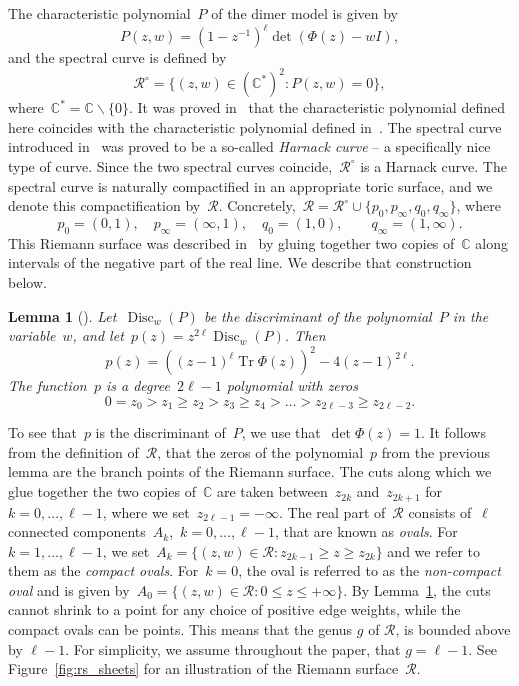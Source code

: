 \documentclass[11pt]{article}
\theoremstyle{plain}
\newtheorem{lemma}[theorem]{Lemma}
\theoremstyle{definition}
\numberwithin{equation}{section}
\newcommand{\CC}{\mathbb{C}}
\DeclareMathOperator{\Tr}{Tr}
\begin{document}
The characteristic polynomial~$P$ of the dimer model is given by
\begin{equation}
P(z,w)=(1-z^{-1})^\ell \det(\Phi(z)-wI),
\end{equation}
and the spectral curve is defined by
\begin{equation}
\mathcal R^\circ=\{(z,w)\in (\CC^*)^2: P(z,w)=0\},
\end{equation}
where~$\CC^*=\CC\backslash\{0\}$. It was proved in~\cite{Ber21} that the characteristic polynomial defined here coincides with the characteristic polynomial defined in~\cite{KOS06}. The spectral curve introduced in~\cite{KOS06} was proved to be a so-called \emph{Harnack curve} -- a specifically nice type of curve. Since the two spectral curves coincide,~$\mathcal R^\circ$ is a Harnack curve. The spectral curve is naturally compactified in an appropriate toric surface, and we denote this compactification by~$\mathcal R$. Concretely,~$\mathcal R=\mathcal R^{\circ}\cup\{p_0,p_\infty,q_0,q_\infty\}$, where
\begin{equation}
p_0=(0,1), \quad p_\infty=(\infty,1), \quad q_0=(1,0), \quad \quad q_\infty=(1,\infty).
\end{equation}
This Riemann surface was described in~\cite{Ber21} by gluing together two copies of~$\CC$ along intervals of the negative part of the real line. We describe that construction below.
\begin{lemma}[\cite{Ber21}]\label{lem:zeros_disc}
Let~$\operatorname{Disc}_w(P)$ be the discriminant of the polynomial~$P$ in the variable~$w$, and let~$p(z)=z^{2\ell}\operatorname{Disc}_w(P)$. Then
\begin{equation}
p(z)=\left((z-1)^\ell \Tr \Phi(z)\right)^2-4(z-1)^{2\ell}.
\end{equation}
The function~$p$ is a degree~$2\ell-1$ polynomial with zeros
\begin{equation}
0=z_0>z_1\geq z_2>z_3\geq z_4>\dots >z_{2\ell-3}\geq z_{2\ell-2}.
\end{equation}
\end{lemma}
To see that~$p$ is the discriminant of~$P$, we use that~$\det \Phi(z)=1$. It follows from the definition of~$\mathcal R$, that the zeros of the polynomial~$p$ from the previous lemma are the branch points of the Riemann surface. The cuts along which we glue together the two copies of~$\CC$ are taken between~$z_{2k}$ and~$z_{2k+1}$ for~$k=0,\dots,\ell-1$, where we set~$z_{2\ell-1}=-\infty$. The real part of~$\mathcal R$ consists of~$\ell$ connected components~$A_k$,~$k=0,\dots,\ell-1$, that are known as \emph{ovals}. For~$k=1,\dots,\ell-1$, we set~$A_k=\{(z,w)\in \mathcal R:z_{2k-1}\geq z\geq z_{2k}\}$ and we refer to them as the \emph{compact ovals}. For~$k=0$, the oval is referred to as the \emph{non-compact oval} and is given by~$A_0=\{(z,w)\in \mathcal R:0\leq z\leq +\infty\}$. By Lemma~\ref{lem:zeros_disc}, the cuts cannot shrink to a point for any choice of positive edge weights, while the compact ovals can be points. This means that the genus $g$ of $\mathcal R$, is bounded above by $\ell-1$. For simplicity, we assume throughout the paper, that $g=\ell-1$. See Figure~\ref{fig:rs_sheets} for an illustration of the Riemann surface~$\mathcal R$. 
\end{document}
